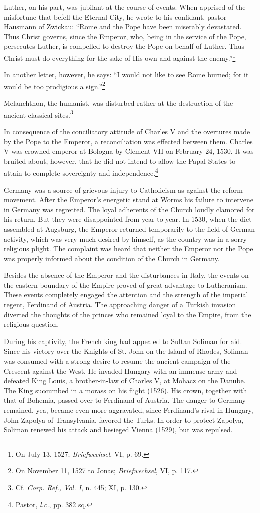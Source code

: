 Luther, on his part, was jubilant at the course of events. When
apprised of the misfortune that befell the Eternal City, he wrote to
his confidant, pastor Hausmann of Zwickau: “Rome and the Pope
have been miserably devastated. Thus Christ governs, since the Emperor,
who, being in the service of the Pope, persecutes Luther, is
compelled to destroy the Pope on behalf of Luther. Thus Christ must
do everything for the sake of His own and against the enemy.”\footnote{On July 13, 1527; \textit{Briefwechsel}, VI, p. 69.}

In another letter, however, he says: “I would not like to see Rome
burned; for it would be too prodigious a sign.”\footnote{On November 11, 1527 to Jonas; \textit{Briefwechsel}, VI, p. 117.}

Melanchthon, the
humanist, was disturbed rather at the destruction of the ancient
classical sites.\footnote{Cf. \textit{Corp. Ref., Vol. I}, n. 445; XI, p. 130.}

In consequence of the conciliatory attitude of Charles V and the
overtures made by the Pope to the Emperor, a reconciliation was effected
between them. Charles V was crowned emperor at Bologna
by Clement VII on February 24, 1530. It was bruited about, however,
that he did not intend to allow the Papal States to attain to complete
sovereignty and independence.\footnote{Pastor, \textit{l.c.}, pp. 382 sq.}

Germany was a source of grievous injury to Catholicism as against
the reform movement. After the Emperor’s energetic stand at Worms
his failure to intervene in Germany was regretted. The loyal adherents
of the Church loudly clamored for his return. But they were disappointed
from year to year. In 1530, when the diet assembled at
Augsburg, the Emperor returned temporarily to the field of German
activity, which was very much desired by himself, as the country was
in a sorry religious plight. The complaint was heard that neither the
Emperor nor the Pope was properly informed about the condition of
the Church in Germany.

Besides the absence of the Emperor and the disturbances in Italy,
the events on the eastern boundary of the Empire proved of great advantage
to Lutheranism. These events completely engaged the attention and the
strength of the imperial regent, Ferdinand of Austria.
The approaching danger of a Turkish invasion diverted the thoughts
of the princes who remained loyal to the Empire, from the religious
question.

During his captivity, the French king had appealed to Sultan
Soliman for aid. Since his victory over the Knights of St. John on the
Island of Rhodes, Soliman was consumed with a strong desire to resume
the ancient campaign of the Crescent against the West. He invaded Hungary
with an immense army and defeated King Louis, a
brother-in-law of Charles V, at Mohacz on the Danube. The King
succumbed in a morass on his flight (1526). His crown, together
with that of Bohemia, passed over to Ferdinand of Austria. The danger
to Germany remained, yea, became even more aggravated, since
Ferdinand’s rival in Hungary, John Zapolya of Transylvania, favored
the Turks. In order to protect Zapolya, Soliman renewed his attack
and besieged Vienna (1529), but was repulsed.

